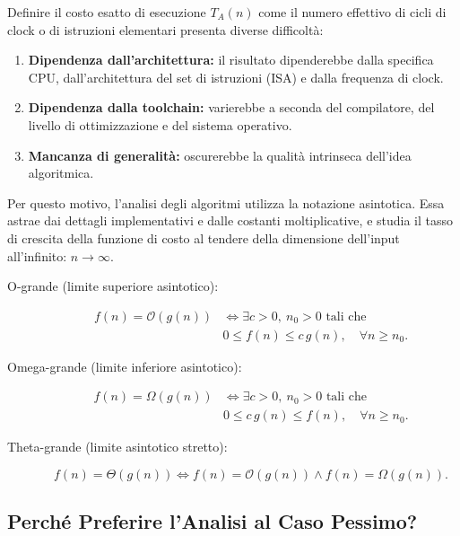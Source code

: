 Definire il costo esatto di esecuzione $T_A(n)$ come il numero effettivo di cicli di clock o di istruzioni elementari presenta diverse difficoltà:

\begin{enumerate}
  \item \textbf{Dipendenza dall'architettura:} il risultato dipenderebbe dalla specifica CPU, dall'architettura del set di istruzioni (ISA) e dalla frequenza di clock.
  \item \textbf{Dipendenza dalla toolchain:} varierebbe a seconda del compilatore, del livello di ottimizzazione e del sistema operativo.
  \item \textbf{Mancanza di generalità:} oscurerebbe la qualità intrinseca dell'idea algoritmica.
\end{enumerate}

Per questo motivo, l'analisi degli algoritmi utilizza la notazione asintotica. Essa astrae dai dettagli implementativi e dalle costanti moltiplicative, e studia il tasso di crescita della funzione di costo al tendere della dimensione dell'input all'infinito: $n \to \infty$.

\begin{description}
  \item[O-grande (limite superiore asintotico):]
    \[
      \begin{aligned}
        f(n) = \mathcal{O}(g(n)) &\iff
        \exists c > 0,\ n_0 > 0\text{ tali che}\\
        &0 \leq f(n) \leq c\,g(n),\quad \forall n \geq n_0.
      \end{aligned}
    \]
  \item[Omega-grande (limite inferiore asintotico):]
    \[
      \begin{aligned}
        f(n) = \Omega(g(n)) &\iff
        \exists c > 0,\ n_0 > 0\text{ tali che}\\
        &0 \leq c\,g(n) \leq f(n),\quad \forall n \geq n_0.
      \end{aligned}
    \]
  \item[Theta-grande (limite asintotico stretto):]
    \[
      f(n) = \Theta(g(n)) \iff
      f(n) = \mathcal{O}(g(n)) \land f(n) = \Omega(g(n)).
    \]
\end{description}

\FloatBarrier
\subsection{Perché Preferire l'Analisi al Caso Pessimo?}


